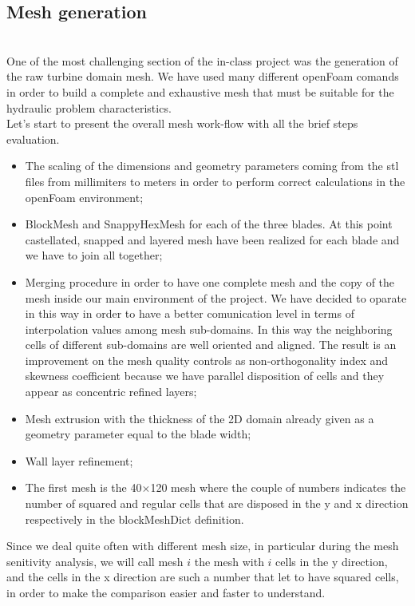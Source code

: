 \documentclass[a4paper,12pt]{article}
\begin{document}
\subsection{Mesh generation}\mbox{}\\
One of the most challenging section of the in-class project was the generation of the raw turbine domain mesh. We have used many different openFoam comands in order to build a complete and exhaustive mesh that must be suitable for the hydraulic problem characteristics.
\\ 
Let's start to present the overall mesh work-flow with all the brief steps evaluation.
\\
\begin{itemize}
\item The scaling of the dimensions and geometry parameters coming from the stl files from millimiters to meters in order to perform correct calculations in the openFoam environment;

\item BlockMesh and SnappyHexMesh for each of the three blades. At this point castellated, snapped and layered mesh have been realized for each blade and we have to join all together;

\item Merging procedure in order to have one complete mesh and the copy of the mesh inside our main environment of the project. We have decided to oparate in this way in order to have a better comunication level in terms of interpolation values among mesh sub-domains. In this way the neighboring cells of different sub-domains are well oriented and aligned. The result is an improvement on the mesh quality controls as non-orthogonality index and skewness coefficient  because we have parallel disposition of cells and they appear as concentric refined layers;

\item Mesh extrusion with the thickness of the 2D domain already given as a geometry parameter equal to the blade width;

\item Wall layer refinement;

\item The first mesh is the 40$\times$120 mesh where the couple of numbers indicates the number of squared and regular cells that are disposed in the y and x direction respectively in the blockMeshDict definition.  
\end{itemize}

Since we deal quite often with different mesh size, in particular during the mesh senitivity analysis, we will call mesh $i$ the mesh with $i$ cells in the y direction, and the cells in the x direction are such a number that let to have squared cells, in order to make the comparison easier and faster to understand.
\end{document}
